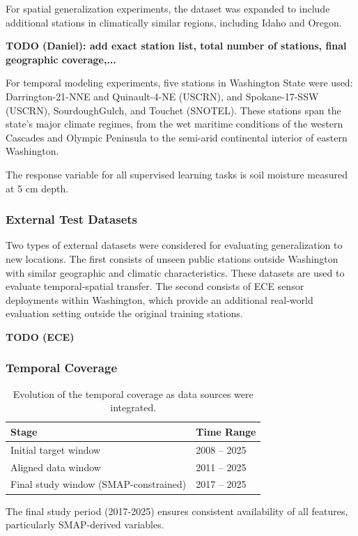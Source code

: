 For spatial generalization experiments, the dataset was expanded to include additional stations in climatically similar regions, including Idaho and Oregon.

\textbf{TODO (Daniel): add exact station list, total number of stations, final geographic coverage,...}

For temporal modeling experiments, five stations in Washington State were used: Darrington-21-NNE and Quinault-4-NE (USCRN), and Spokane-17-SSW (USCRN), SourdoughGulch, and Touchet (SNOTEL). These stations span the state's major climate regimes, from the wet maritime conditions of the western Cascades and Olympic Peninsula to the semi-arid continental interior of eastern Washington.

The response variable for all supervised learning tasks is soil moisture measured at 5 cm depth.

\subsubsection*{External Test Datasets}

Two types of external datasets were considered for evaluating generalization to new locations.
The first consists of unseen public stations outside Washington with similar geographic and climatic characteristics. These datasets are used to evaluate temporal-spatial transfer.
The second consists of ECE sensor deployments within Washington, which provide an additional real-world evaluation setting outside the original training stations.

\textbf{TODO (ECE)}

\subsubsection*{Temporal Coverage}

\begin{table}[H]
\centering
\begin{tabular}{ll}
\toprule
\textbf{Stage} & \textbf{Time Range} \\
\midrule
Initial target window & 2008 -- 2025 \\
Aligned data window & 2011 -- 2025 \\
Final study window (SMAP-constrained) & 2017 -- 2025 \\
\bottomrule
\end{tabular}
\caption{Evolution of the temporal coverage as data sources were integrated.}
\end{table}

The final study period (2017-2025) ensures consistent availability of all features, particularly SMAP-derived variables.
